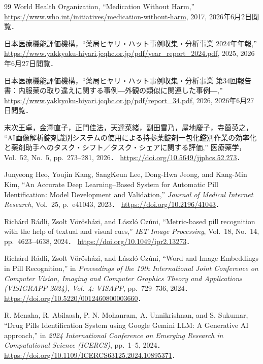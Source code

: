 \documentclass[dvipdfmx]{jsarticle}
\begin{document}
\begin{thebibliography}{99}
World Health Organization, ``Medication Without Harm,''
\url{https://www.who.int/initiatives/medication-without-harm}, 2017, 2026年6月2日閲覧．

日本医療機能評価機構，``薬局ヒヤリ・ハット事例収集・分析事業 2024年年報,''
\url{https://www.yakkyoku-hiyari.jcqhc.or.jp/pdf/year_report_2024.pdf}, 2025, 2026年6月27日閲覧．

日本医療機能評価機構，``薬局ヒヤリ・ハット事例収集・分析事業 第34回報告書：内服薬の取り違えに関する事例―外観の類似に関連した事例―,''
\url{https://www.yakkyoku-hiyari.jcqhc.or.jp/pdf/report_34.pdf}, 2026, 2026年6月27日閲覧．

末次王卓，金澤直子，正門佳法，天達菜緒，副田雪乃，屋地慶子，寺薗英之，
``AI画像解析錠剤識別システムの使用による持参薬錠剤一包化鑑別作業の効率化と薬剤助手へのタスク・シフト／タスク・シェアに関する評価,''
医療薬学，Vol.~52, No.~5, pp.~273--281, 2026．
\url{https://doi.org/10.5649/jjphcs.52.273}．

Junyeong Heo, Youjin Kang, SangKeun Lee, Dong-Hwa Jeong, and Kang-Min Kim,
``An Accurate Deep Learning--Based System for Automatic Pill Identification: Model Development and Validation,''
\textit{Journal of Medical Internet Research}, Vol.~25, p.~e41043, 2023．
\url{https://doi.org/10.2196/41043}．

Rich\'{a}rd R\'{a}dli, Zsolt V\"{o}r\"{o}sh\'{a}zi, and L\'{a}szl\'{o} Cz\'{u}ni,
``Metric-based pill recognition with the help of textual and visual cues,''
\textit{IET Image Processing}, Vol.~18, No.~14, pp.~4623--4638, 2024．
\url{https://doi.org/10.1049/ipr2.13273}．

Rich\'{a}rd R\'{a}dli, Zsolt V\"{o}r\"{o}sh\'{a}zi, and L\'{a}szl\'{o} Cz\'{u}ni,
``Word and Image Embeddings in Pill Recognition,''
in \textit{Proceedings of the 19th International Joint Conference on Computer Vision, Imaging and Computer Graphics Theory and Applications (VISIGRAPP 2024), Vol.~4: VISAPP}, pp.~729--736, 2024．
\url{https://doi.org/10.5220/0012460800003660}．

R. Menaha, R. Abilaash, P. N. Mohanram, A. Unnikrishnan, and S. Sukumar,
``Drug Pills Identification System using Google Gemini LLM: A Generative AI approach,''
in \textit{2024 International Conference on Emerging Research in Computational Science (ICERCS)}, pp.~1--5, 2024．
\url{https://doi.org/10.1109/ICERCS63125.2024.10895371}．


\end{thebibliography}
\end{document}

